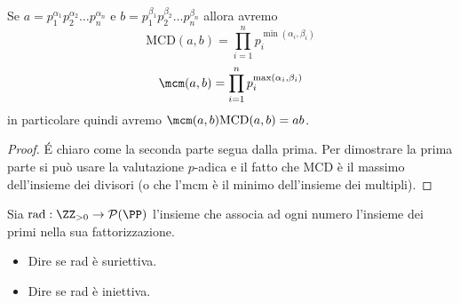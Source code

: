 \documentclass[11pt]{scrartcl}
\newcommand{\parti}{\mathcal{P}}
\newcommand{\MCD}{\text{MCD}}
\begin{document}
	\begin{lemma}
		Se $a=p_1^{\alpha_1}p_2^{\alpha_2}\dots p_n^{\alpha_n}$ e $b=p_1^{\beta_1}p_2^{\beta_2}\dots p_n^{\beta_n}$
		allora avremo 
		$$\MCD(a,b)=\prod_{i=1}^n p_i^{\min(\alpha_i,\beta_i)}$$
		$$\mcm(a,b)=\prod_{i=1}^n p_i^{\max(\alpha_i,\beta_i)}$$
		in particolare quindi avremo $\mcm(a,b)\MCD(a,b)=ab$.
	\end{lemma}
	\begin{proof}
		\'E chiaro come la seconda parte segua dalla prima. Per dimostrare la prima parte si può usare la valutazione $p$-adica e il fatto che MCD è il massimo dell'insieme dei divisori (o che l'mcm è il minimo dell'insieme dei multipli).
	\end{proof}
	\begin{exercise}
		Sia $\text{rad}:\ZZ_{>0}\to \parti(\PP)$ l'insieme che associa ad ogni numero l'insieme dei primi nella sua fattorizzazione.
		\begin{itemize}
			\item Dire se rad è suriettiva.
			\item Dire se rad è iniettiva.
		\end{itemize}
	\end{exercise}
\end{document}
